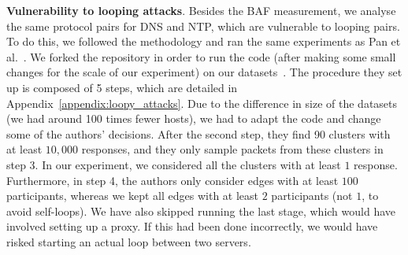  \textbf{Vulnerability to looping attacks}. Besides the BAF measurement, we analyse the same protocol pairs for DNS and NTP, which are vulnerable to looping pairs. To do this, we followed the methodology and ran the same experiments as Pan et al.~\cite{cispa-loopy}. We forked the repository in order to run the code (after making some small changes for the scale of our experiment) on our datasets~\cite{loopy_code}. The procedure they set up is composed of 5 steps, which are detailed in Appendix~\ref{appendix:loopy_attacks}. Due to the difference in size of the datasets (we had around 100 times fewer hosts), we had to adapt the code and change some of the authors' decisions. After the second step, they find 90 clusters with at least $10,000$ responses, and they only sample packets from these clusters in step 3. In our experiment, we considered all the clusters with at least $1$ response. Furthermore, in step 4, the authors only consider edges with at least $100$ participants, whereas we kept all edges with at least $2$ participants (not $1$, to avoid self-loops). We have also skipped running the last stage, which would have involved setting up a proxy. If this had been done incorrectly, we would have risked starting an actual loop between two servers.




